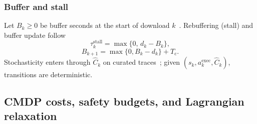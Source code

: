 \documentclass[preprint,12pt,times]{elsarticle}
\begin{document}
\subsubsection{Buffer and stall}
Let \(B_k\ge 0\) be buffer seconds at the start of download \(k\)~\cite{yin2015control,mao2017neural}.
Rebuffering (stall) and buffer update follow
\begin{equation}
    \tau^{\mathrm{stall}}_k=\max\{0,\, d_k-B_k\},
\end{equation}
\begin{equation}
    \label{eq:buffer}
    B_{k+1}=\max\{0,B_k-d_k\}+T_{\mathrm{c}}.
\end{equation}
Stochasticity enters through \(\hat{C}_k\) on curated traces~\cite{fcc2015mba,kvalbein2014,bentaleb2018survey}; given \((s_k,a^{\mathrm{exec}}_k,\hat{C}_k)\), transitions are deterministic.

\subsection{CMDP costs, safety budgets, and Lagrangian relaxation}
\end{document}
